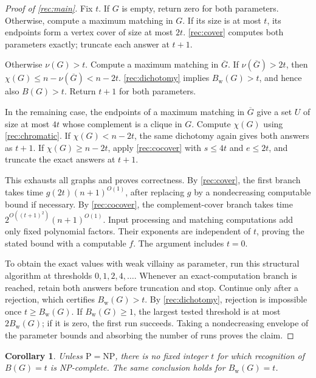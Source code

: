 \documentclass[11pt,reqno]{amsart}
\numberwithin{equation}{section}
\newtheorem{corollary}[theorem]{Corollary}
\theoremstyle{definition}
\theoremstyle{remark}
\begin{document}
\begin{proof}[Proof of \cref{rec:main}]
Fix $t$. If $G$ is empty, return zero for both parameters.
Otherwise, compute a maximum matching in $G$. If its size is at most
$t$, its endpoints form a vertex cover of size at most $2t$.
\cref{rec:cover} computes both parameters exactly;
truncate each answer at $t+1$.

Otherwise $\nu(G)>t$. Compute a maximum matching in $\overline G$.
If $\nu(\overline G)>2t$, then
$\chi(G)\leq n-\nu(\overline G)<n-2t$.
\cref{rec:dichotomy} implies $B_{\mathrm w}(G)>t$, and hence also
$B(G)>t$. Return $t+1$ for both parameters.

In the remaining case, the endpoints of a maximum matching in
$\overline G$ give a set $U$ of size at most $4t$ whose complement
is a clique in $G$. Compute $\chi(G)$ using
\cref{rec:chromatic}. If $\chi(G)<n-2t$, the same dichotomy
again gives both answers as $t+1$. If $\chi(G)\geq n-2t$, apply
\cref{rec:cocover} with $s\leq4t$ and $e\leq2t$, and
truncate the exact answers at $t+1$.

This exhausts all graphs and proves correctness. By \cref{rec:cover},
the first branch takes time $g(2t)(n+1)^{O(1)}$, after replacing
$g$ by a nondecreasing computable bound if necessary.
By \cref{rec:cocover}, the complement-cover branch takes time
$2^{O((t+1)^2)}(n+1)^{O(1)}$. Input processing and matching
computations add only fixed polynomial factors. Their exponents
are independent of $t$, proving the stated bound with a computable
$f$. The argument includes $t=0$.

To obtain the exact values with weak villainy as parameter, run this
structural algorithm at
thresholds $0,1,2,4,\ldots$. Whenever an exact-computation branch
is reached, retain both answers before truncation and stop.
Continue only after a rejection, which certifies
$B_{\mathrm w}(G)>t$. By \cref{rec:dichotomy}, rejection is
impossible once $t\ge B_{\mathrm w}(G)$.
If $B_{\mathrm w}(G)\ge1$, the largest tested threshold is at most
$2B_{\mathrm w}(G)$; if it is zero, the first run succeeds.
Taking a nondecreasing envelope of the parameter bounds and
absorbing the number of runs proves the claim.
\end{proof}

\begin{corollary}\label{rec:fixed-complexity}
Unless $\mathrm P=\mathrm{NP}$, there is no fixed integer $t$ for
which recognition of $B(G)=t$ is NP-complete. The same conclusion
holds for $B_{\mathrm w}(G)=t$.
\end{corollary}
\end{document}
